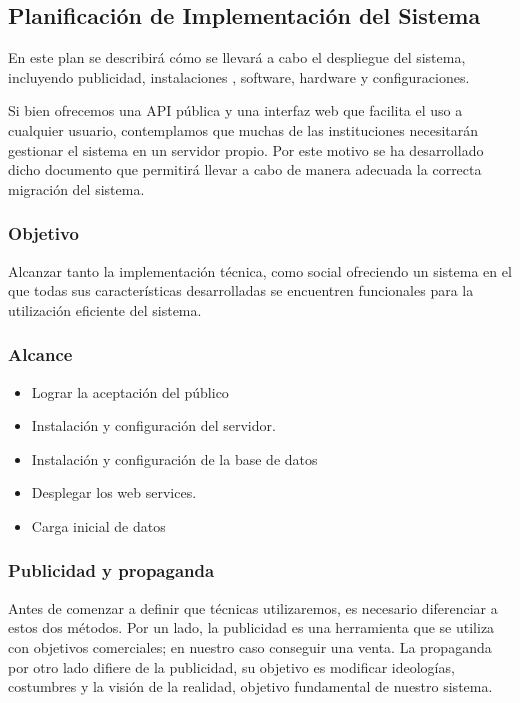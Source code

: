 \subsection{Planificación de Implementación del Sistema}
En este plan se describirá cómo se llevará a cabo el despliegue del sistema, incluyendo publicidad, instalaciones , software, hardware y configuraciones.

Si bien ofrecemos una API pública y una interfaz web que facilita el uso a cualquier usuario, contemplamos que muchas de las instituciones necesitarán gestionar el sistema en un servidor propio. Por este motivo se ha desarrollado dicho documento que permitirá llevar a cabo de manera adecuada la correcta migración del sistema.

\subsubsection{Objetivo}


Alcanzar tanto la implementación técnica, como social ofreciendo un sistema en el que todas sus características desarrolladas se encuentren funcionales para la utilización eficiente del sistema.

\subsubsection{Alcance}
\begin{itemize}
	\item Lograr la aceptación del público
	\item Instalación y configuración del servidor.
	\item Instalación y configuración de la base de datos
	\item Desplegar los web services.
	\item Carga inicial de datos
\end{itemize}

\subsubsection{Publicidad y propaganda}

Antes de comenzar a definir que técnicas utilizaremos, es necesario diferenciar a estos dos métodos. Por un lado, la publicidad es una herramienta que se utiliza con objetivos comerciales; en nuestro caso conseguir una venta. La propaganda por otro lado difiere de la publicidad, su objetivo es modificar ideologías, costumbres y la visión de la realidad, objetivo fundamental de nuestro sistema.

